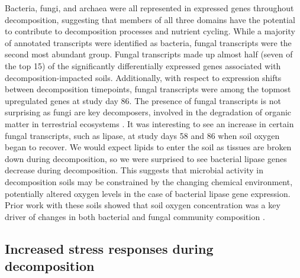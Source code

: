 \documentclass[
  sn-nature,
  lineno, referee]{sn-jnl}
\begin{document}
Bacteria, fungi, and archaea were all represented in expressed genes
throughout decomposition, suggesting that members of all three domains
have the potential to contribute to decomposition processes and nutrient
cycling. While a majority of annotated transcripts were identified as
bacteria, fungal transcripts were the second most abundant group. Fungal
transcripts made up almost half (seven of the top 15) of the
significantly differentially expressed genes associated with
decomposition-impacted soils. Additionally, with respect to expression
shifts between decomposition timepoints, fungal transcripts were among
the topmost upregulated genes at study day 86. The presence of fungal
transcripts is not surprising as fungi are key decomposers, involved in
the degradation of organic matter in terrestrial ecosystems
\citep{van_der_wal_thready_2013}. It was interesting to see an increase
in certain fungal transcripts, such as lipase, at study days 58 and 86
when soil oxygen began to recover. We would expect lipids to enter the
soil as tissues are broken down during decomposition, so we were
surprised to see bacterial lipase genes decrease during decomposition.
This suggests that microbial activity in decomposition soils may be
constrained by the changing chemical environment, potentially altered
oxygen levels in the case of bacterial lipase gene expression. Prior
work with these soils showed that soil oxygen concentration was a key
driver of changes in both bacterial and fungal community composition
\citep{taylor_transient_2024}.

\subsection{Increased stress responses during
decomposition}\label{increased-stress-responses-during-decomposition}
\end{document}
